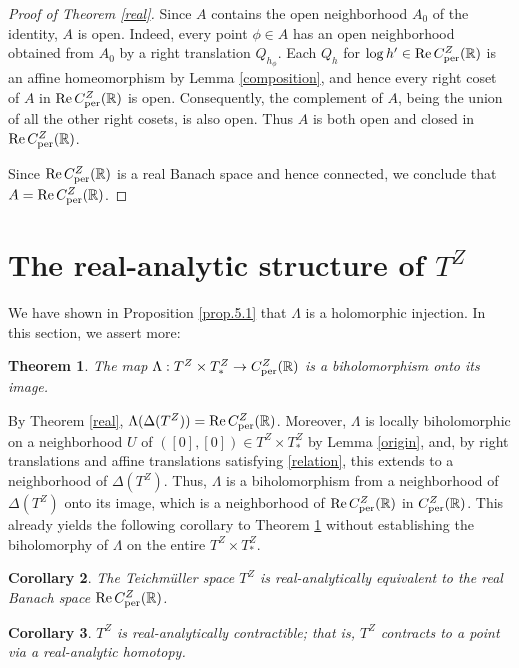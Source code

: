 \documentclass[amstex]{amsart}
\newtheorem{theorem}{Theorem}[section]
\newtheorem{corollary}[theorem]{Corollary}
\theoremstyle{definition}
\theoremstyle{remark}
\numberwithin{equation}{section}
\begin{document}
\begin{proof}[Proof of Theorem \ref{real}]
Since $A$ contains the open neighborhood $A_0$ of the identity,
$A$ is open. Indeed, every point $\phi \in A$ has an open neighborhood
obtained from $A_0$ by a right translation $Q_{h_\phi}$.
Each $Q_h$ for $\log h' \in {\rm Re}\,C^Z_{\rm per}(\mathbb R)$ is an affine homeomorphism by Lemma \ref{composition},
and hence every right coset of $A$ in ${\rm Re}\,C^Z_{\rm per}(\mathbb R)$ is open. Consequently,
the complement of $A$, being the union of all the other right
cosets, is also open. Thus $A$ is both open and closed in
${\rm Re}\,C^Z_{\rm per}(\mathbb R)$.

Since ${\rm Re}\,C^Z_{\rm per}(\mathbb R)$ is a real Banach
space and hence connected, we conclude that
$A={\rm Re}\,C^Z_{\rm per}(\mathbb R)$.
\end{proof}


\section{The real-analytic structure of $T^Z$}\label{6}

We have shown in Proposition \ref{prop.5.1} that $\Lambda$ is a holomorphic injection.
In this section, we assert more:

\begin{theorem}\label{biholo}
The map $\Lambda: T^Z \times T^Z_* \to C^Z_{\rm per}(\mathbb R)$ 
is a biholomorphism onto its image.
\end{theorem}

By Theorem \ref{real}, 
$\Lambda(\Delta(T^Z))={\rm Re}\,C^Z_{\rm per}(\mathbb R)$.
Moreover, $\Lambda$ is locally biholomorphic on a neighborhood $U$ of $([0],[0]) \in T^Z \times T^Z_*$ 
by Lemma \ref{origin}, and, by right translations and affine translations satisfying \eqref{relation},  
this extends to a neighborhood of $\Delta(T^Z)$.
Thus, $\Lambda$ is a biholomorphism from a neighborhood of $\Delta(T^Z)$ onto its image, which is a neighborhood of 
${\rm Re}\,C^Z_{\rm per}(\mathbb R)$ in $C^Z_{\rm per}(\mathbb R)$.
This already yields the following corollary to Theorem \ref{biholo}
without establishing the biholomorphy of $\Lambda$ on the entire $T^Z \times T^Z_*$.

\begin{corollary}\label{real-analytic}
The Teichm\"uller space $T^Z$ is real-analytically equivalent to 
the real Banach space ${\rm Re}\,C^Z_{\rm per}(\mathbb R)$.
\end{corollary}

\begin{corollary}\label{contractible}
$T^Z$ is real-analytically contractible; that is,
$T^Z$ contracts to a point via a real-analytic homotopy.
\end{corollary}
\end{document}
